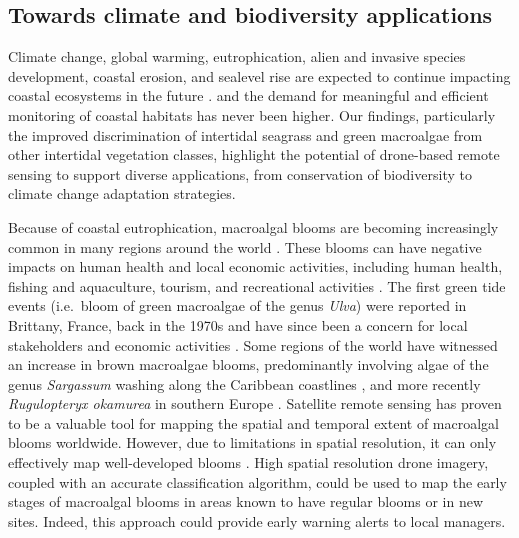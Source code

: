 \documentclass[
  number]{elsarticle}
\begin{document}
\subsection{Towards climate and biodiversity
applications}\label{towards-climate-and-biodiversity-applications}

Climate change, global warming, eutrophication, alien and invasive
species development, coastal erosion, and sealevel rise are expected to
continue impacting coastal ecosystems in the future
\citetext{\citealp{SCHIBALSKI2022101414}; \citealp[
]{holon2018predictive}; \citealp{marquet2024global}}. and the demand for
meaningful and efficient monitoring of coastal habitats has never been
higher\citetext{\citealp[ ]{muller2018satellite}; \citealp[
]{villalobos2023remote}; \citealp{oiry2021using}}. Our findings,
particularly the improved discrimination of intertidal seagrass and
green macroalgae from other intertidal vegetation classes, highlight the
potential of drone-based remote sensing to support diverse applications,
from conservation of biodiversity to climate change adaptation
strategies.

Because of coastal eutrophication, macroalgal blooms are becoming
increasingly common in many regions around the world \citetext{\citealp[
]{sutton2011european}; \citealp{ye2011green}}. These blooms can have
negative impacts on human health and local economic activities,
including human health, fishing and aquaculture, tourism, and
recreational activities \citetext{\citealp[
]{villares1999nitrogen}; \citealp{ye2011green}}. The first green tide
events (i.e.~bloom of green macroalgae of the genus \emph{Ulva}) were
reported in Brittany, France, back in the 1970s and have since been a
concern for local stakeholders and economic activities
\citep{menesguen2018marees}. Some regions of the world have witnessed an
increase in brown macroalgae blooms, predominantly involving algae of
the genus \emph{Sargassum} washing along the Caribbean coastlines
\citep{louime2017sargassum}, and more recently \emph{Rugulopteryx
okamurea} in southern Europe \citep{Roca2022}. Satellite remote sensing
has proven to be a valuable tool for mapping the spatial and temporal
extent of macroalgal blooms worldwide. However, due to limitations in
spatial resolution, it can only effectively map well-developed blooms
\citetext{\citealp[ ]{rs13081408}; \citealp[
]{klemas2012remote}; \citealp{haro2023biointertidal}}. High spatial
resolution drone imagery, coupled with an accurate classification
algorithm, could be used to map the early stages of macroalgal blooms in
areas known to have regular blooms or in new sites. Indeed, this
approach could provide early warning alerts to local managers.
\end{document}
